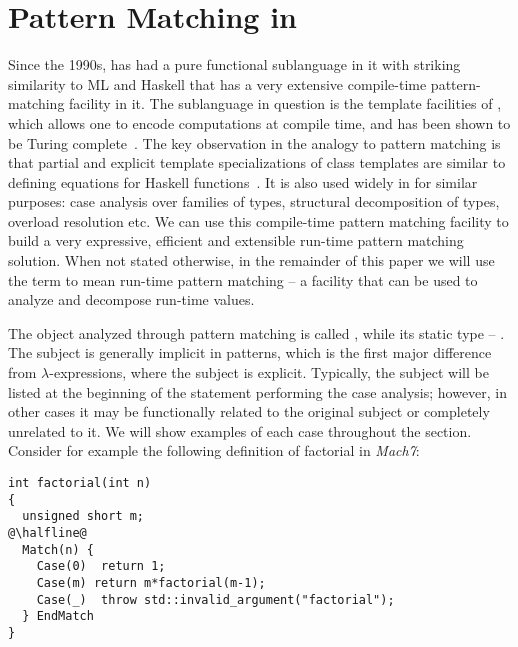 \section{Pattern Matching in \Cpp{}} %
\label{sec:cpppat}

Since the 1990s, \Cpp{} has had a pure functional sublanguage in it with striking similarity 
to ML and Haskell that has a very extensive compile-time pattern-matching 
facility in it. The sublanguage in question is the template facilities of 
\Cpp{}, which allows one to encode computations at compile time, and has been 
shown to be Turing complete~\cite{veldhuizen:templates_turing_complete}.
The key observation in the analogy to pattern matching is that partial and 
explicit template specializations of \Cpp{} class templates are similar to 
defining equations for Haskell functions~\cite{Milewski11}. It is also used 
widely in \Cpp{} for similar purposes: case analysis over families of types, 
structural decomposition of types, overload resolution etc. We can use this 
compile-time pattern matching facility to build a very expressive, efficient and
extensible run-time pattern matching solution. When not stated otherwise, in the 
remainder of this paper we will use the term  to mean 
run-time pattern matching -- a facility that can be used to analyze and 
decompose run-time values.


The object analyzed through pattern matching is called , while its 
static type -- . The subject is generally implicit in 
patterns, which is the first major difference from $\lambda$-expressions, where 
the subject is explicit. Typically, the subject will be listed at the beginning 
of the statement performing the case analysis; however, in other cases it may be 
functionally related to the original subject or completely unrelated to it. We 
will show examples of each case throughout the section. Consider for example the 
following definition of factorial in \emph{Mach7}:

\begin{lstlisting}[keepspaces]
int factorial(int n)
{
  unsigned short m;
@\halfline@
  Match(n) {
    Case(0)  return 1;
    Case(m) return m*factorial(m-1);
    Case(_)  throw std::invalid_argument("factorial");
  } EndMatch
}
\end{lstlisting}

